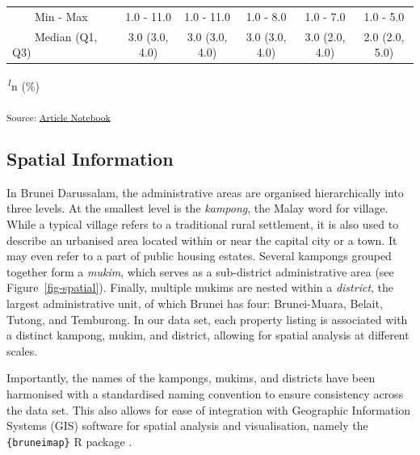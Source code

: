 \documentclass[
  number]{elsarticle}
\begin{document}
\begin{landscape}
\begin{table}
{\begin{tabular*}{\linewidth}{@{\extracolsep{\fill}}lcccccc}
    Min - Max &  & 1.0 - 11.0 & 1.0 - 11.0 & 1.0 - 8.0 & 1.0 - 7.0 & 1.0 - 5.0 \\ 
    Median (Q1, Q3) &  & 3.0 (3.0, 4.0) & 3.0 (3.0, 4.0) & 3.0 (3.0, 4.0) & 3.0 (2.0, 4.0) & 2.0 (2.0, 5.0) \\ 
\bottomrule
\end{tabular*}
\begin{minipage}{\linewidth}
\textsuperscript{\textit{1}}n (\%)\\
\end{minipage}

\textsubscript{Source:
\href{https://Bruneiverse.github.io/house-data/manuscript-preview.html}{Article
Notebook}}

}

\end{table}%

\end{landscape}

\subsection{Spatial Information}\label{spatial-information}

In Brunei Darussalam, the administrative areas are organised
hierarchically into three levels. At the smallest level is the
\emph{kampong}, the Malay word for village. While a typical village
refers to a traditional rural settlement, it is also used to describe an
urbanised area located within or near the capital city or a town. It may
even refer to a part of public housing estates. Several kampongs grouped
together form a \emph{mukim}, which serves as a sub-district
administrative area (see Figure~\ref{fig-spatial}). Finally, multiple
mukims are nested within a \emph{district}, the largest administrative
unit, of which Brunei has four: Brunei-Muara, Belait, Tutong, and
Temburong. In our data set, each property listing is associated with a
distinct kampong, mukim, and district, allowing for spatial analysis at
different scales.

Importantly, the names of the kampongs, mukims, and districts have been
harmonised with a standardised naming convention to ensure consistency
across the data set. This also allows for ease of integration with
Geographic Information Systems (GIS) software for spatial analysis and
visualisation, namely the \texttt{\{bruneimap\}} R package
\citep{jamil2024bruneimap}.
\end{document}
